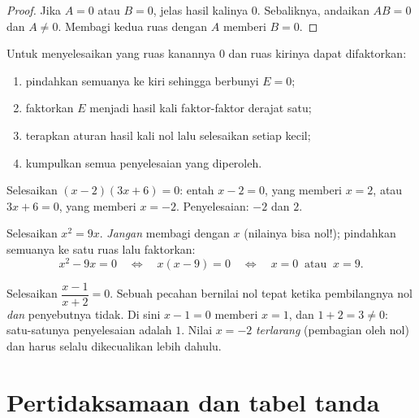 \begin{proof}
Jika $A = 0$ atau $B = 0$, jelas hasil kalinya $0$. Sebaliknya, andaikan
$AB = 0$ dan $A \neq 0$. Membagi kedua ruas dengan $A$ memberi $B = 0$.
\end{proof}

\begin{method}\label{met:g10:algebra:zeroproduct}
Untuk menyelesaikan  yang ruas kanannya $0$ dan ruas kirinya dapat
difaktorkan:
\begin{enumerate}
  \item pindahkan semuanya ke kiri sehingga  berbunyi $E = 0$;
  \item faktorkan $E$ menjadi hasil kali faktor-faktor derajat satu;
  \item terapkan aturan hasil kali nol lalu selesaikan setiap  kecil;
  \item kumpulkan semua penyelesaian yang diperoleh.
\end{enumerate}
\end{method}

\begin{example}\label{ex:g10:algebra:zeroproduct}
Selesaikan $(x - 2)(3x + 6) = 0$: entah $x - 2 = 0$, yang memberi $x = 2$,
atau $3x + 6 = 0$, yang memberi $x = -2$. Penyelesaian: $-2$ dan $2$.

Selesaikan $x^2 = 9x$. \emph{Jangan} membagi dengan $x$ (nilainya bisa nol!);
pindahkan semuanya ke satu ruas lalu faktorkan:
\[
x^2 - 9x = 0
\quad\Longleftrightarrow\quad
x(x - 9) = 0
\quad\Longleftrightarrow\quad
x = 0 \ \text{ atau } \ x = 9 .
\]
\end{example}

\begin{example}\label{ex:g10:algebra:quotient}
Selesaikan $\dfrac{x - 1}{x + 2} = 0$. Sebuah pecahan bernilai nol tepat
ketika pembilangnya nol \emph{dan} penyebutnya tidak. Di sini $x - 1 = 0$
memberi $x = 1$, dan $1 + 2 = 3 \neq 0$: satu-satunya penyelesaian adalah $1$.
Nilai $x = -2$ \emph{terlarang} (pembagian oleh nol) dan harus selalu
dikecualikan lebih dahulu.
\end{example}

\section{Pertidaksamaan dan tabel tanda}

